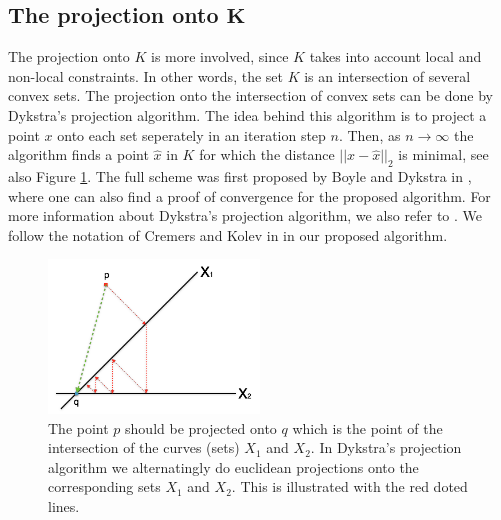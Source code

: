 \documentclass[abstracton]{scrreprt}
\begin{document}
        \subsection{The projection onto $\boldsymbol{K}$} %
        \label{sub:the_projection_onto_K}
            The projection onto $K$ is more involved, since $K$ takes into account local and non-local constraints. In other words, the set $K$ is an intersection of several convex sets. The projection onto the intersection of convex sets can be done by Dykstra's projection algorithm. The idea behind this algorithm is to project a point $x$ onto each set seperately in an iteration step $n$. Then, as $n \to \infty$ the algorithm finds a point $\hat{x}$ in $K$ for which the distance $||x - \hat{x}||_{2}$ is minimal, see also Figure \ref{fig:dykstra}. The full scheme was first proposed by Boyle and Dykstra in \cite{dykstra-et-al-aors14}, where one can also find a proof of convergence for the proposed algorithm. For more information about Dykstra's projection algorithm, we also refer to \cite{dykstra-et-al-aors14}. We follow the notation of Cremers and Kolev in \cite{Cremers-Kolev-pami11} in our proposed algorithm.
            \begin{figure}[!ht]
                \centering
                \includegraphics[width=0.5\textwidth]{img/dykstra.png}
                \caption[Dykstra's iteration scheme.]{The point $p$ should be projected onto $q$ which is the point of the intersection of the curves (sets) $X_{1}$ and $X_{2}$. In Dykstra's projection algorithm we alternatingly do euclidean projections onto the corresponding sets $X_{1}$ and $X_{2}$. This is illustrated with the red doted lines.}
                \label{fig:dykstra}
            \end{figure}
\end{document}
